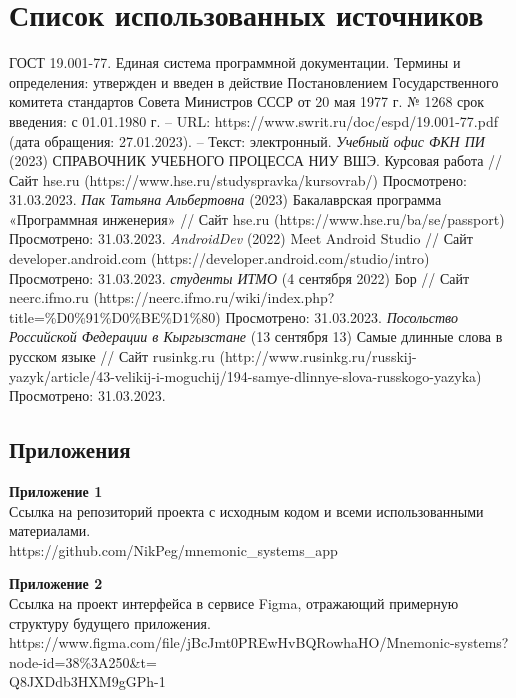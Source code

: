 \documentclass[draft]{article}
\newcommand\zz[1]{\par{\normalsize\strut #1} \hfill\ignorespaces}
\begin{document}
\section*{Список использованных источников}
\begin{thebibliography}{}
 ГОСТ 19.001-77. Единая система программной документации. Термины и определения: утвержден и введен в действие Постановлением Государственного комитета стандартов Совета Министров СССР от 20 мая 1977 г. № 1268 срок введения: с 01.01.1980 г. – URL: https://www.swrit.ru/doc/espd/19.001-77.pdf (дата обращения: 27.01.2023). – Текст: электронный.
 \textit{Учебный офис ФКН ПИ} (2023) СПРАВОЧНИК УЧЕБНОГО ПРОЦЕССА НИУ ВШЭ. Курсовая работа // Сайт hse.ru (https://www.hse.ru/studyspravka/kursovrab/) Просмотрено: 31.03.2023.
 \textit{Пак Татьяна Альбертовна} (2023) Бакалаврская программа «Программная инженерия» // Сайт hse.ru (https://www.hse.ru/ba/se/passport) Просмотрено: 31.03.2023.
 \textit{AndroidDev} (2022) Meet Android Studio // Сайт developer.android.com (https://developer.android.com/studio/intro) Просмотрено: 31.03.2023.
 \textit{студенты ИТМО} (4 сентября 2022) Бор // Сайт neerc.ifmo.ru (https://neerc.ifmo.ru/wiki/index.php?title=\%D0\%91\%D0\%BE\%D1\%80) Просмотрено: 31.03.2023.
 \textit{Посольство Российской Федерации в Кыргызстане} (13 сентября 13) Самые длинные слова в русском языке // Сайт rusinkg.ru (http://www.rusinkg.ru/russkij-yazyk/article/43-velikij-i-moguchij/194-samye-dlinnye-slova-russkogo-yazyka) Просмотрено: 31.03.2023.
\end{thebibliography}
\newpage
\begin{center}
\section*{Приложения}
\end{center}
\zz{}\textbf{Приложение 1\\}
Ссылка на репозиторий проекта с исходным кодом и всеми использованными материалами.\\
https://github.com/NikPeg/mnemonic\_systems\_app\\
\zz{}\textbf{Приложение 2\\}
Ссылка на проект интерфейса в сервисе Figma, отражающий примерную структуру будущего приложения.\\
https://www.figma.com/file/jBcJmt0PREwHvBQRowhaHO/Mnemonic-systems?node-id=38\%3A250\&t=\\
Q8JXDdb3HXM9gGPh-1\\
\end{document}

